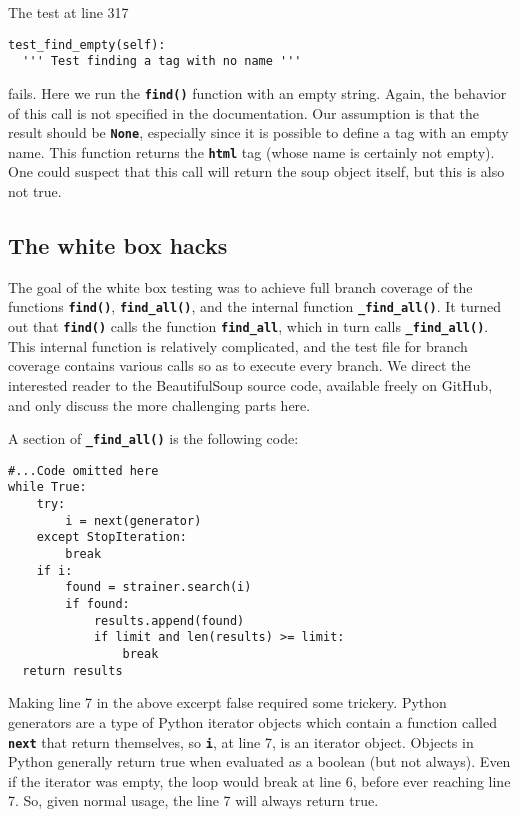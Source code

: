 \documentclass[10pt]{article}
\newcommand{\tbt}[1]{\texttt{\textbf{#1}}}
\begin{document}
\noindent\begin{minipage}{\textwidth}
\indent{\hspace{12pt}} The test at line 317
\begin{lstlisting}[style = pythonstyle]
test_find_empty(self):
  ''' Test finding a tag with no name '''
\end{lstlisting}
\end{minipage}
fails. Here we run the \tbt{find()} function with an empty string. Again, the behavior of this call is not specified in the documentation. Our assumption is that the result should be \tbt{None}, especially since it is possible to define a tag with an empty name. This function returns the \tbt{html} tag (whose name is certainly not empty). One could suspect that this call will return the soup object itself, but this is also not true. 

\subsection{The white box hacks}

The goal of the white box testing was to achieve full branch coverage of the functions \tbt{find()}, \tbt{find\_all()}, and the internal function \tbt{\_find\_all()}. It turned out that \tbt{find()} calls the function \tbt{find\_all}, which in turn calls \tbt{\_find\_all()}. This internal function is relatively complicated, and the test file for branch coverage contains various calls so as to execute every branch. We direct the interested reader to the BeautifulSoup source code, available freely on GitHub, and only discuss the more challenging parts here. \\

\noindent\begin{minipage}{\textwidth}
\indent{\hspace{12pt}} A section of \tbt{\_find\_all()} is the following code:
\begin{lstlisting}[style = pythonstyle-with-numbers]
#...Code omitted here
while True:
    try:
        i = next(generator)
    except StopIteration:
        break
    if i:
        found = strainer.search(i)
        if found:
            results.append(found)
            if limit and len(results) >= limit:
                break
  return results
\end{lstlisting}
\end{minipage}

Making line 7 in the above excerpt false required some trickery. Python generators are a type of Python iterator objects which contain a function called \tbt{next} that return themselves, so \tbt{i}, at line 7, is an iterator object. Objects in Python generally return true when evaluated as a boolean (but not always). Even if the iterator was empty, the loop would break at line 6, before ever reaching line 7. So, given normal usage, the line 7 will always return true. \\
\end{document}
